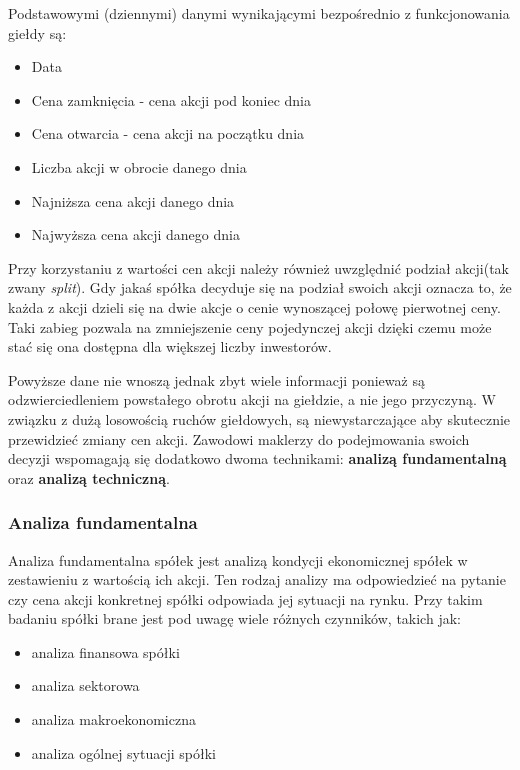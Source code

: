\documentclass[a4paper, twoside, 11pt, openright]{article}
\begin{document}
Podstawowymi (dziennymi) danymi wynikającymi bezpośrednio z funkcjonowania giełdy są:

\begin{itemize}
\item{Data}
\item{Cena zamknięcia} - cena akcji pod koniec dnia
\item{Cena otwarcia} - cena akcji na początku dnia
\item{Liczba akcji w obrocie danego dnia}
\item{Najniższa cena akcji danego dnia}
\item{Najwyższa cena akcji danego dnia}
\end{itemize}

 Przy korzystaniu z wartości cen akcji należy również uwzględnić podział akcji(tak zwany \textit{split}). Gdy jakaś spółka decyduje się na podział swoich akcji oznacza to, że każda z akcji dzieli się na dwie akcje o cenie wynoszącej połowę pierwotnej ceny. Taki zabieg pozwala na zmniejszenie ceny pojedynczej akcji dzięki czemu może stać się ona dostępna dla większej liczby inwestorów. 
 
\bigskip

Powyższe dane nie wnoszą jednak zbyt wiele informacji ponieważ są odzwierciedleniem powstałego obrotu akcji na giełdzie, a nie jego przyczyną. W związku z dużą losowością ruchów giełdowych, są niewystarczające aby skutecznie przewidzieć zmiany cen akcji. Zawodowi maklerzy do podejmowania swoich decyzji wspomagają się dodatkowo dwoma technikami: \textbf{analizą fundamentalną} oraz \textbf{analizą techniczną}.

\subsubsection{Analiza fundamentalna}

Analiza fundamentalna \cite{fundamentalanalysis} spółek jest analizą kondycji ekonomicznej spółek w zestawieniu z wartością ich akcji. Ten rodzaj analizy ma odpowiedzieć na pytanie czy cena akcji konkretnej spółki odpowiada jej sytuacji na rynku. Przy takim badaniu spółki brane jest pod uwagę wiele różnych czynników, takich jak:
\begin{itemize}
\item{analiza finansowa spółki}
\item{analiza sektorowa}
\item{analiza makroekonomiczna}
\item{analiza ogólnej sytuacji spółki}
\end{itemize}
\end{document}
